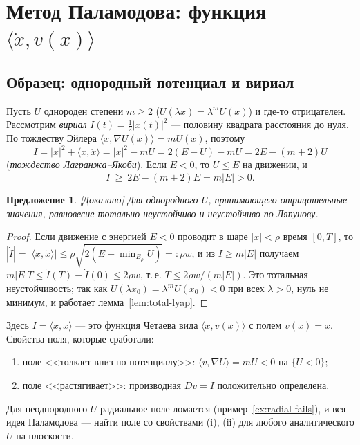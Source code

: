 \documentclass[11pt,a4paper]{article}
\newtheorem{proposition}[theorem]{Предложение}
\theoremstyle{definition}
\newcommand{\mk}[1]{\textsf{[#1]}}
\newcommand{\term}[1]{\emph{#1}}
\begin{document}
\section{Метод Паламодова: функция $\langle\dot x,v(x)\rangle$}\label{sec:method}

\subsection{Образец: однородный потенциал и вириал}

Пусть $U$ однороден степени $m\ge2$ ($U(\lambda x)=\lambda^mU(x)$) и где-то отрицателен.
Рассмотрим \term{вириал} $I(t)=\tfrac12|x(t)|^2$ --- половину квадрата расстояния до нуля.
По тождеству Эйлера $\langle x,\nabla U(x)\rangle=mU(x)$, поэтому
\[
\ddot I=|\dot x|^2+\langle x,\ddot x\rangle=|\dot x|^2-mU=2(E-U)-mU=2E-(m+2)U
\]
(\term{тождество Лагранжа--Якоби}). Если $E<0$, то $U\le E$ на движении, и
\[
\ddot I\ \ge\ 2E-(m+2)E=m|E|>0.
\]

\begin{proposition}\label{prop:homog}
\mk{Доказано} Для однородного $U$, принимающего отрицательные значения, равновесие тотально
неустойчиво и неустойчиво по Ляпунову.
\end{proposition}
\begin{proof}
Если движение с энергией $E<0$ проводит в шаре $|x|<\rho$ время $[0,T]$, то
$|\dot I|=|\langle x,\dot x\rangle|\le\rho\sqrt{2(E-\min_{B_\rho}U)}=:\rho w$, и из
$\ddot I\ge m|E|$ получаем $m|E|T\le\dot I(T)-\dot I(0)\le2\rho w$, т.\,е. $T\le2\rho w/(m|E|)$.
Это тотальная неустойчивость; так как $U(\lambda x_0)=\lambda^mU(x_0)<0$ при всех $\lambda>0$,
нуль не минимум, и работает лемма~\ref{lem:total-lyap}.
\end{proof}

Здесь $\dot I=\langle\dot x,x\rangle$ --- это функция Четаева вида $\langle\dot x,v(x)\rangle$ с
полем $v(x)=x$. Свойства поля, которые сработали:
\begin{enumerate}[label=(\roman*)]
\item поле <<толкает вниз по потенциалу>>: $\langle v,\nabla U\rangle=mU<0$ на $\{U<0\}$;
\item поле <<растягивает>>: производная $Dv=I$ положительно определена.
\end{enumerate}
Для неоднородного $U$ радиальное поле ломается (пример~\ref{ex:radial-fails}), и вся идея
Паламодова --- найти поле со свойствами (i), (ii) для любого аналитического $U$ на плоскости.
\end{document}
